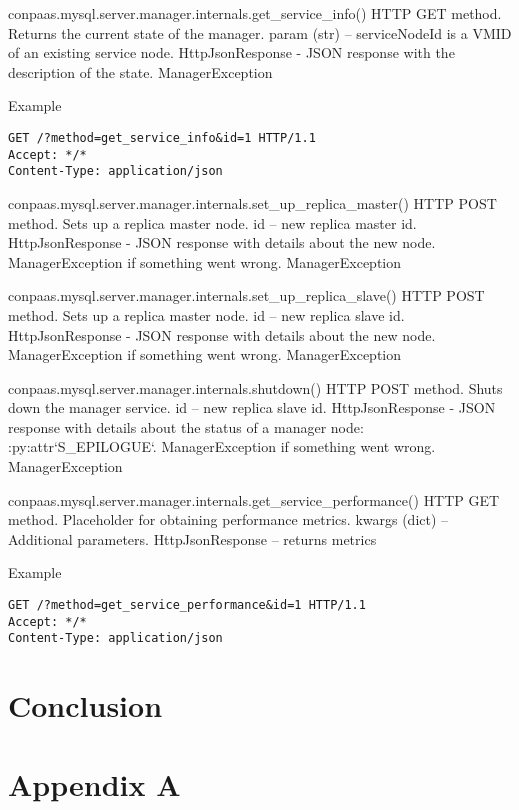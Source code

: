 \documentclass[a4paper,10pt]{article}
\begin{document}
\noindent\conapi
{ conpaas.mysql.server.manager.internals.get\_service\_info()}
{HTTP GET method. Returns the current state of the manager.}
{param (str) -- serviceNodeId is a VMID of an existing service node.}
{HttpJsonResponse - JSON response with the description of the state.}
{ManagerException}

Example
\begin{Verbatim}[frame=single]
GET /?method=get_service_info&id=1 HTTP/1.1
Accept: */*
Content-Type: application/json
\end{Verbatim}

\noindent\conapi
{ conpaas.mysql.server.manager.internals.set\_up\_replica\_master()}
{HTTP POST method. Sets up a replica master node.}
{ id -- new replica master id.}
{HttpJsonResponse - JSON response with details about the new
      node. ManagerException if something went wrong.}
{ManagerException}
     
\noindent\conapi
{ conpaas.mysql.server.manager.internals.set\_up\_replica\_slave()}
{HTTP POST method. Sets up a replica master node.}
{  id -- new replica slave id.}
{ HttpJsonResponse - JSON response with details about the new
      node. ManagerException if something went wrong.}
{ManagerException}


\noindent\conapi
{ conpaas.mysql.server.manager.internals.shutdown()}
{HTTP POST method. Shuts down the manager service.}
{  id -- new replica slave id.}
{ HttpJsonResponse - JSON response with details about the status
      of a manager node: :py:attr`S\_EPILOGUE`. ManagerException if
      something went wrong.}
{ManagerException}

\noindent\conapi
{ conpaas.mysql.server.manager.internals.get\_service\_performance()}
{ HTTP GET method. Placeholder for obtaining performance metrics.}
{ kwargs (dict) -- Additional parameters.}
{HttpJsonResponse -- returns metrics}
{}

Example
\begin{Verbatim}[frame=single]
GET /?method=get_service_performance&id=1 HTTP/1.1
Accept: */*
Content-Type: application/json
\end{Verbatim}

\newpage

\section{Conclusion}

\newpage

\section{Appendix A}
\label{app:install}
\end{document}

